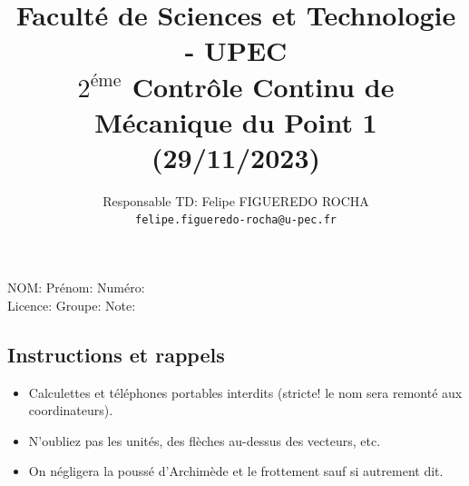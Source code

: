 \documentclass[french,10pt]{article}
\title{ \large
	Faculté de Sciences et Technologie - UPEC \\
	$2^{\textrm{éme}}$ Contrôle Continu de Mécanique du Point 1 (29/11/2023)\\ }
\author{Responsable TD: Felipe FIGUEREDO ROCHA \\ \texttt{felipe.figueredo-rocha@u-pec.fr}}
\date{}
\begin{document}
	
	\maketitle
	
	\thispagestyle{empty}
	
	\vspace{-0.5cm}
	NOM:\underline{\hspace{7cm}} Prénom: \underline{\hspace{5cm}}  Numéro: \underline{\hspace{2cm}} \\
	Licence:\underline{\hspace{7cm}} Groupe: \underline{\hspace{5cm}} Note: \underline{\hspace{1.5cm}}

	\subsection*{Instructions et rappels}
	\begin{itemize}
		\item Calculettes et téléphones portables interdits (stricte! le nom sera remonté aux coordinateurs). 
		\item N'oubliez pas les unités, des flèches au-dessus des vecteurs, etc.
		\item On négligera la poussé d'Archimède et le frottement sauf si autrement dit.
	\end{itemize}
	
\end{document}
